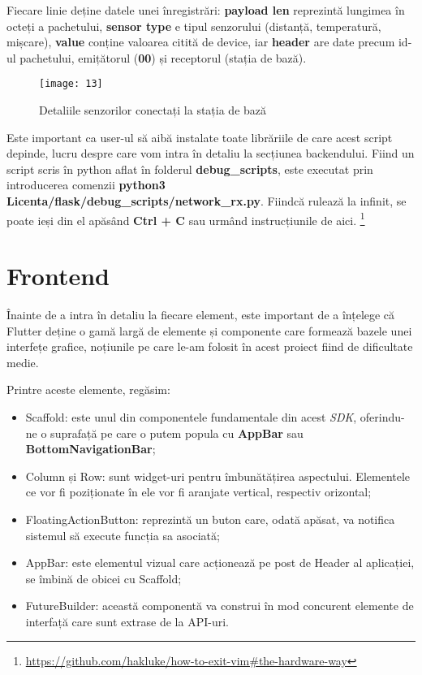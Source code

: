 Fiecare linie deține datele unei înregistrări: \textbf{payload len} reprezintă lungimea în octeți a pachetului, \textbf{sensor type} e tipul senzorului (distanță, temperatură, mișcare), \textbf{value} conține valoarea citită de device, iar \textbf{header} are date precum id-ul pachetului, emițătorul (\textbf{00}) și receptorul (stația de bază).

\begin{figure}[h]
	\centering
	\texttt{[image: 13]}
	\caption{Detaliile senzorilor conectați la stația de bază}
	\label{fig:13}
\end{figure}

Este important ca user-ul să aibă instalate toate librăriile de care acest script depinde, lucru despre care vom intra în detaliu la secțiunea backendului. Fiind un script scris în python aflat în folderul \textbf{debug\_scripts}, este executat prin introducerea comenzii \textbf{python3 Licenta/flask/debug\_scripts/network\_rx.py}. Fiindcă rulează la infinit, se poate ieși din el apăsând \textbf{Ctrl + C} sau urmând instrucțiunile de aici. \footnote{\url{https://github.com/hakluke/how-to-exit-vim\#the-hardware-way}}

\newpage

\section{Frontend}

Înainte de a intra în detaliu la fiecare element, este important de a înțelege că Flutter deține o gamă largă de elemente și componente care formează bazele unei interfețe grafice, noțiunile pe care le-am folosit în acest proiect fiind de dificultate medie.

Printre aceste elemente, regăsim:
\begin{itemize}
	\item Scaffold: este unul din componentele fundamentale din acest \emph{SDK}, oferindu-ne o suprafață pe care o putem popula cu \textbf{AppBar} sau \textbf{BottomNavigationBar};
	
	\item Column și Row: sunt widget-uri pentru îmbunătățirea aspectului. Elementele ce vor fi poziționate în ele vor fi aranjate vertical, respectiv orizontal;
	
	\item FloatingActionButton: reprezintă un buton care, odată apăsat, va notifica sistemul să execute funcția sa asociată;
	
	\item AppBar: este elementul vizual care acționează pe post de Header al aplicației, se îmbină de obicei cu Scaffold;
	
	\item FutureBuilder: această componentă va construi în mod concurent elemente de interfață care sunt extrase de la API-uri.
\end{itemize}

